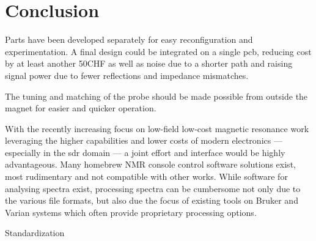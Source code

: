 \chapter{Conclusion}

Parts have been developed separately for easy reconfiguration and experimentation. A final design could be integrated on a single \acrshort{pcb}, reducing cost by at least another \approx50CHF as well as noise due to a shorter path and raising signal power due to fewer reflections and impedance mismatches.

The tuning and matching of the probe should be made possible from outside the magnet for easier and quicker operation.

With the recently increasing focus on low-field low-cost magnetic resonance work leveraging the higher capabilities and lower costs of modern electronics --- especially in the \acrshort{sdr} domain --- a joint effort and interface would be highly advantageous. Many homebrew NMR console control software solutions exist, most rudimentary and not compatible with other works. While software for analysing spectra exist, processing spectra can be cumbersome not only due to the various file formats, but also due the focus of existing tools on Bruker and Varian systems which often provide proprietary processing options.

Standardization

